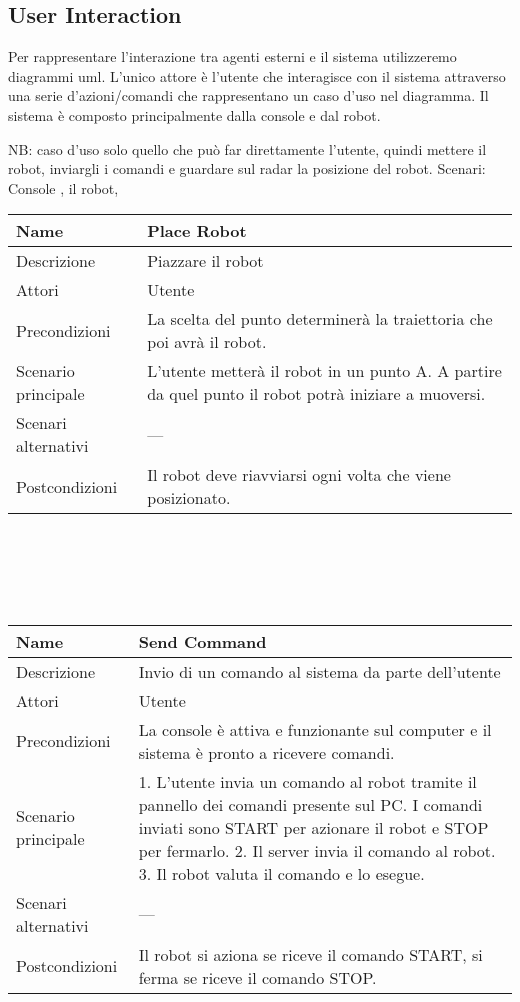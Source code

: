 \documentclass[a4paper]{article}
\begin{document}
\subsection {User Interaction}

Per rappresentare l’interazione tra agenti esterni e il sistema utilizzeremo diagrammi uml.
L’unico attore è l’utente che interagisce con il sistema attraverso una serie d’azioni/comandi che rappresentano un caso d’uso nel diagramma. Il sistema è composto principalmente dalla console e dal robot. 

NB: caso d’uso solo quello che può far direttamente l’utente, quindi mettere il robot, inviargli i comandi e guardare sul radar la posizione del robot. 
Scenari: Console , il robot,
\\
\begin{tabular}{ | m{5cm} | m{5cm}| }
\hline
	Name&Place Robot\\ 
\hline	
	Descrizione&Piazzare il robot\\
\hline	
	Attori&Utente\\
\hline	
	Precondizioni&La scelta del punto determinerà la traiettoria che poi avrà il robot.\\
\hline	
Scenario principale&L’utente metterà il robot in un punto A. A partire da quel punto il robot potrà iniziare a muoversi.\\
\hline	
Scenari alternativi&---\\
\hline	
Postcondizioni&Il robot deve riavviarsi ogni volta che viene posizionato.\\
\hline
\end{tabular}
\\
\\
\\
\\

\begin{tabular}{ | m{5cm} | m{5cm}| }
	\hline
	Name&Send Command\\ 
	\hline	
	Descrizione&Invio di un comando al sistema da parte dell’utente\\
	\hline	
	Attori&Utente\\
	\hline	
	Precondizioni&La console è attiva e funzionante sul computer e il sistema è pronto a ricevere comandi.\\
	\hline	
	Scenario principale&1. L’utente invia un comando al robot tramite il pannello dei comandi presente sul PC. I comandi inviati sono START per azionare il robot e STOP per fermarlo.
	2. Il server invia il comando al robot.
	3. Il robot valuta il comando e lo esegue.\\
	\hline	
	Scenari alternativi&---\\
	\hline	
	Postcondizioni&Il robot si aziona se riceve il comando START, si ferma se riceve il comando STOP.\\
	\hline
\end{tabular}
\end{document}
